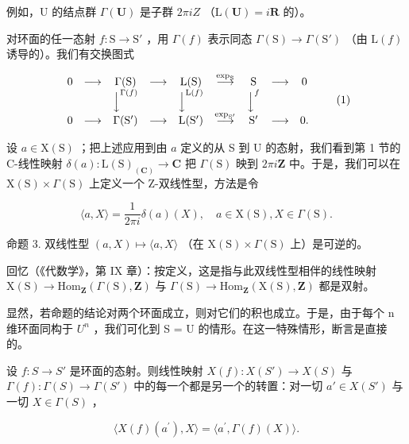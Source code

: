 例如，U 的结点群 \(\Gamma(\mathbf{U})\) 是子群 \(2\pi iZ\) （\(\mathrm{L}(\mathbf{U}) = i\mathbf{R}\) 的）。

对环面的任一态射 \(f: \mathrm{S} \to \mathrm{S}'\) ，用 \(\Gamma(f)\) 表示同态 \(\Gamma(\mathrm{S}) \to \Gamma(\mathrm{S}')\) （由 \(\mathrm{L}(f)\) 诱导的）。我们有交换图式

\[
\begin{array}{c c c c c c c c c} 0 & \longrightarrow & \Gamma (\mathrm{S}) & \longrightarrow & \mathrm{L} (\mathrm{S}) & \stackrel {{\exp_ {\mathrm{S}}}} {{\longrightarrow}} & \mathrm{S} & \longrightarrow & 0 \\ & & \Big \downarrow^ {\Gamma (f)} & & \Big \downarrow^ {\mathrm{L} (f)} & & \Big \downarrow^ {f} \\ 0 & \longrightarrow & \Gamma (\mathrm{S} ^ {\prime}) & \longrightarrow & \mathrm{L} (\mathrm{S} ^ {\prime}) & \stackrel {{\exp_ {\mathrm{S} ^ {\prime}}}} {{\longrightarrow}} & \mathrm{S} ^ {\prime} & \longrightarrow & 0. \end{array}\tag{1}
\]

设 \(a \in \mathrm{X}(\mathrm{S})\) ；把上述应用到由 \(a\) 定义的从 S 到 U 的态射，我们看到第 1 节的 C-线性映射 \(\delta(a) : \mathrm{L}(\mathrm{S})_{(\mathbf{C})} \to \mathbf{C}\) 把 \(\Gamma(\mathrm{S})\) 映到 \(2\pi i\mathbf{Z}\) 中。于是，我们可以在 \(\mathrm{X}(\mathrm{S}) \times \Gamma(\mathrm{S})\) 上定义一个 Z-双线性型，方法是令

\[
\langle a, X \rangle = \frac {1}{2 \pi i} \delta (a) (X), \quad a \in \mathrm{X(S)}, X \in \Gamma (\mathrm{S}).\tag{2}
\]

命题 3. 双线性型 \((a,X)\mapsto \langle a,X\rangle\) （在 \(\mathrm{X(S)}\times \Gamma (\mathrm{S})\) 上）是可逆的。

回忆（《代数学》，第 IX 章）：按定义，这是指与此双线性型相伴的线性映射 \(\mathrm{X}(\mathrm{S}) \to \mathrm{Hom}_{\mathbf{Z}}(\varGamma(\mathrm{S}), \mathbf{Z})\) 与 \(\varGamma(\mathrm{S}) \to \mathrm{Hom}_{\mathbf{Z}}(\mathrm{X}(\mathrm{S}), \mathbf{Z})\) 都是双射。

显然，若命题的结论对两个环面成立，则对它们的积也成立。于是，由于每个 n 维环面同构于 \(U^{n}\) ，我们可化到 S = U 的情形。在这一特殊情形，断言是直接的。

设 \(f: S \to S'\) 是环面的态射。则线性映射 \(X(f): X(S') \to X(S)\) 与 \(\Gamma(f): \Gamma(S) \to \Gamma(S')\) 中的每一个都是另一个的转置：对一切 \(a' \in X(S')\) 与一切 \(X \in \Gamma(S)\) ，

\[
\langle X (f) (a ^ {\prime}), X \rangle = \langle a ^ {\prime}, \Gamma (f) (X) \rangle .\tag{3}
\]

